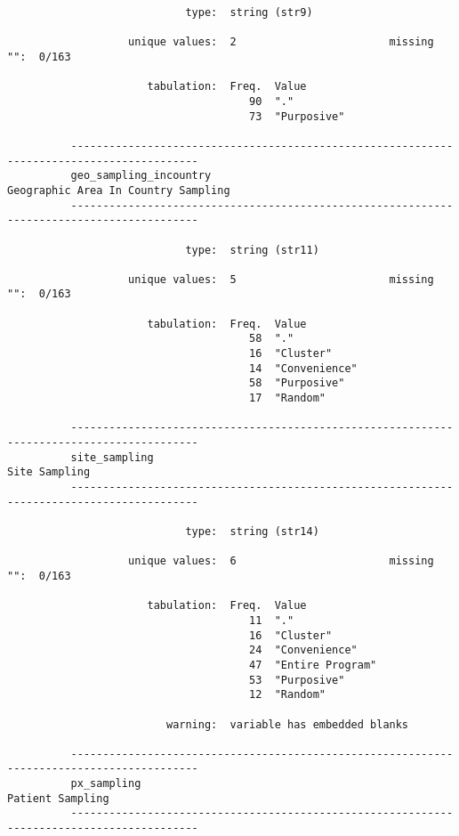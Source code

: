 \documentclass{article}
\begin{document}
\begin{verbatim}
                            type:  string (str9)
          
                   unique values:  2                        missing "":  0/163
          
                      tabulation:  Freq.  Value
                                      90  "."
                                      73  "Purposive"
          
          ------------------------------------------------------------------------------------------
          geo_sampling_incountry                                 Geographic Area In Country Sampling
          ------------------------------------------------------------------------------------------
          
                            type:  string (str11)
          
                   unique values:  5                        missing "":  0/163
          
                      tabulation:  Freq.  Value
                                      58  "."
                                      16  "Cluster"
                                      14  "Convenience"
                                      58  "Purposive"
                                      17  "Random"
          
          ------------------------------------------------------------------------------------------
          site_sampling                                                                Site Sampling
          ------------------------------------------------------------------------------------------
          
                            type:  string (str14)
          
                   unique values:  6                        missing "":  0/163
          
                      tabulation:  Freq.  Value
                                      11  "."
                                      16  "Cluster"
                                      24  "Convenience"
                                      47  "Entire Program"
                                      53  "Purposive"
                                      12  "Random"
          
                         warning:  variable has embedded blanks
          
          ------------------------------------------------------------------------------------------
          px_sampling                                                               Patient Sampling
          ------------------------------------------------------------------------------------------
          

\end{verbatim}
\end{document}
